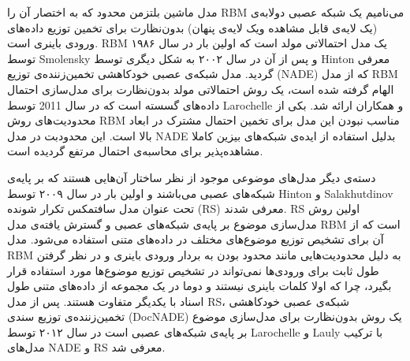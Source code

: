 \documentclass[12pt,a4paper]{article}
\begin{document}
مدل ماشین بلتزمن محدود که به اختصار آن را RBM می‌نامیم یک شبکه عصبی دولابه‌ی (یک لایه‌ی قابل مشاهده ویک لایه‌ی پنهان) بدون‌نظارت برای تخمین توزیع داده‌های ورودی باینری است. RBM یک مدل‌ احتمالاتی مولد است که اولین بار در سال ۱۹۸۶ توسط	Smolensky و پس از آن در سال ۲۰۰۲ به شکل دیگری توسط Hinton معرفی‌ گردید. مدل شبکه‌‌ی عصبی خودکاهشی تخمین‌زننده‌ی توزیع (NADE) که از مدل RBM
الهام گرفته شده است، یک روش احتمالاتی مولد بدون‌نظارت برای مدل‌سازی احتمال داده‌های گسسته است که در سال 2011 توسط Larochelle و همکاران ارائه شد. بکی از محدودیت‌های روش RBM مناسب نبودن این مدل برای تخمین احتمال مشترک در ابعاد بالا است. این محدودبت در مدل NADE بدلیل استفاده از ایده‌ی شبکه‌های بیزین کاملا مشاهده‌پذیر برای محاسبه‌ی احتمال مرتفع گردیده است.

دسته‌ی دیگر مدل‌های موضوعی موجود از نظر ساختار آن‌هایی هستند که بر پایه‌ی شبکه‌های عصبی می‌‌باشند و اولین بار در سال ۲۰۰۹ توسط Hinton و Salakhutdinov تحت عنوان مدل سافتمکس تکرار شونده (RS) معرفی‌ شدند. RS اولین روش مدل‌سازی موضوع بر پایه‌ی شبکه‌های عصبی و گسترش ‌یافته‌ی مدل RBM است که از آن برای تشخیص توزیع موضوع‌های مختلف در داده‌های متنی استفاده می‌‌شود. مدل RBM به دلیل محدودیت‌هایی مانند محدود بودن به بردار ورودی باینری و در نظر گرفتن طول ثابت برای ورودی‌ها نمی‌‌تواند در تشخیص توزیع موضوع‌ها مورد استفاده قرار بگیرد، چرا که اولا کلمات باینری نیستند و دوما در یک مجموعه از داده‌های متنی طول اسناد با یکدیگر متفاوت هستند. پس از مدل RS، شبکه‌‌ی عصبی خودکاهشی تخمین‌زننده‌ی توزیع سندی (DocNADE) یک روش بدون‌نظارت برای مدل‌سازی موضوع بر پایه‌ی شبکه‌های 
عصبی است در سال ۲۰۱۲ توسط Larochelle و Lauly با ترکیب مدل‌های NADE و RS معرفی‌ شد.
\end{document}
